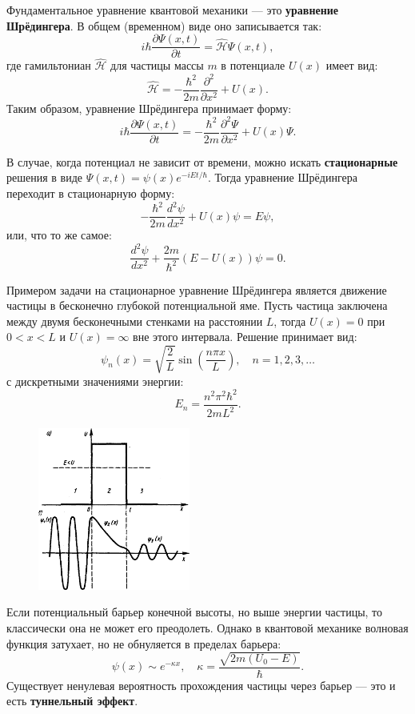 \documentclass[12pt]{article}
\begin{document}
Фундаментальное уравнение квантовой механики — это \textbf{уравнение Шрёдингера}. В общем (временном) виде оно записывается так:
\[
i\hbar \frac{\partial \Psi(x, t)}{\partial t} = \hat{\mathcal{H}} \Psi(x, t),
\]
где гамильтониан $\hat{\mathcal{H}}$ для частицы массы $m$ в потенциале $U(x)$ имеет вид:
\[
\hat{\mathcal{H}} = -\frac{\hbar^2}{2m} \frac{\partial^2}{\partial x^2} + U(x).
\]
Таким образом, уравнение Шрёдингера принимает форму:
\[
i\hbar \frac{\partial \Psi(x, t)}{\partial t} = -\frac{\hbar^2}{2m} \frac{\partial^2 \Psi}{\partial x^2} + U(x)\Psi.
\]

В случае, когда потенциал не зависит от времени, можно искать \textbf{стационарные} решения в виде $\Psi(x, t) = \psi(x)e^{-iEt/\hbar}$. Тогда уравнение Шрёдингера переходит в стационарную форму:
\[
-\frac{\hbar^2}{2m} \frac{d^2 \psi}{dx^2} + U(x)\psi = E\psi,
\]
или, что то же самое:
\[
\frac{d^2 \psi}{dx^2} + \frac{2m}{\hbar^2}(E - U(x))\psi = 0.
\]

Примером задачи на стационарное уравнение Шрёдингера является движение частицы в бесконечно глубокой потенциальной яме. Пусть частица заключена между двумя бесконечными стенками на расстоянии $L$, тогда $U(x) = 0$ при $0 < x < L$ и $U(x) = \infty$ вне этого интервала. Решение принимает вид:
\[
\psi_n(x) = \sqrt{\frac{2}{L}} \sin\left( \frac{n\pi x}{L} \right), \quad n = 1, 2, 3, \ldots
\]
с дискретными значениями энергии:
\[
E_n = \frac{n^2 \pi^2 \hbar^2}{2mL^2}.
\]

\begin{figure}
    \includegraphics[width=5cm]{physics2/images/physics2_2025_05_19_1}
\end{figure}

Если потенциальный барьер конечной высоты, но выше энергии частицы, то классически она не может его преодолеть. Однако в квантовой механике волновая функция затухает, но не обнуляется в пределах барьера:
\[
\psi(x) \sim e^{-\kappa x}, \quad \kappa = \frac{\sqrt{2m(U_0 - E)}}{\hbar}.
\]
Существует ненулевая вероятность прохождения частицы через барьер — это и есть \textbf{туннельный эффект}.
\end{document}
